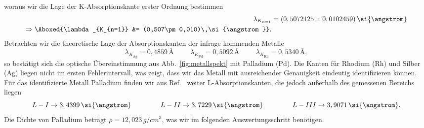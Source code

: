 woraus wir die Lage der K-Absorptionskante erster Ordnung bestimmen
\begin{align}
    \lambda_{K_{n=1}} &= (0,5072125\pm0,0102459)\,\si{\angstrom} \\
    \Rightarrow\Aboxed{\lambda_{K_{n=1}} &= (0,507\pm0,010)\,\si{\angstrom}}.
\end{align}
Betrachten wir die theoretische Lage der Absorptionskanten der infrage kommenden Metalle
\begin{equation}
    \lambda_{K_{\text{Ag}}} = 0,4859\,\si{\angstrom}\hspace{1cm}\lambda_{K_{\text{Pd}}} = 0,5092\,\si{\angstrom}\hspace{1cm}
    \lambda_{K_{\text{Rh}}} = 0,5340\,\si{\angstrom},
\end{equation} 
so bestätigt sich die optische Übereinstimmung aus Abb.~\ref{fig:metallspekt} mit Palladium (Pd).
Die Kanten für Rhodium (Rh) und Silber (Ag) liegen nicht im ersten Fehlerintervall, was zeigt, 
dass wir das Metall mit ausreichender Genauigkeit eindeutig identifizieren können. \\
Für das identifizierte Metall Palladium finden wir aus Ref.~\cite{Database} weiter L-Absorptionskanten, 
die jedoch außerhalb des gemessenen Bereichs liegen 
\begin{equation}
    L-I\rightarrow 3,4399\,\si{\angstrom}\hspace{1.5cm}
    L-II\rightarrow 3,7229\,\si{\angstrom}\hspace{1.5cm}
    L-III\rightarrow 3,9071\,\si{\angstrom}.
\end{equation}
Die Dichte von Palladium beträgt $\rho= 12,023\,\si{g/cm^{3}}$, was wir im 
folgenden Auswertungsschritt benötigen. \\
